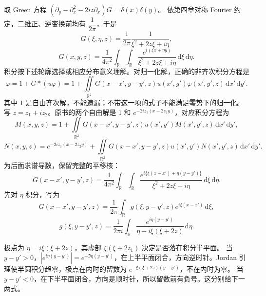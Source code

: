 \documentclass[lang=cn,scheme=chinese,mode=simple,device=normal,color=blue,math=cm,thmcnt=section,12pt]{elegantbook}
\newcommand{\dd}{\,\mathrm{d}}
\newcommand{\eqq}[2]{\tag{#1}\label{eq:#1}#2}
\begin{document}
取 Green 方程 $(\partial_y-\partial_x^2-2iz\partial_x)G=\delta(x)\delta(y)$。
依第四章对称 Fourier 约定，二维正、逆变换前均有 $\dfrac{1}{2\pi}$，于是
\begin{equation}
\eqq{7.5.8}{\widehat G(\xi,\eta,z)=\dfrac{1}{2\pi}\dfrac{1}{\xi^2+2z\xi+i\eta},}
\end{equation}
\begin{equation}
\eqq{7.5.9}{G(x,y,z)=\dfrac{1}{4\pi^2}\int_{\mathbb R}\int_{\mathbb R}
\dfrac{e^{i(\xi x+\eta y)}}{\xi^2+2z\xi+i\eta}\dd\xi\dd\eta.}
\end{equation}
积分按下述轮廓选择或相应分布意义理解。对归一化解，正确的非齐次积分方程是
\begin{equation}
\eqq{7.5.10}{\varphi=1+G*(u\varphi)
=1+\iint\limits_{\mathbb R^2}G(x-x',y-y',z)u(x',y')\varphi(x',y',z)\dd x'\dd y'.}
\end{equation}
其中 $1$ 是自由齐次解，不能遗漏；不带这一项的式子不能满足零势下的归一化。
写 $z=z_1+iz_2$。原书的两个自由解是 $1$ 和 $e^{-2iz_1(x-2z_2y)}$，对应积分方程为
\begin{equation}
\eqq{7.5.11}{M(x,y,z)=1+\iint\limits_{\mathbb R^2}G(x-x',y-y',z)u(x',y')M(x',y',z)\dd x'\dd y',}
\end{equation}
\begin{equation}
\eqq{7.5.12}{N(x,y,z)=e^{-2iz_1(x-2z_2y)}
+\iint\limits_{\mathbb R^2}G(x-x',y-y',z)u(x',y')N(x',y',z)\dd x'\dd y'.}
\end{equation}
为后面求谱导数，保留完整的平移核：
\begin{equation}
\eqq{7.5.13}{G(x-x',y-y',z)=\dfrac{1}{4\pi^2}\int_{\mathbb R}\int_{\mathbb R}
\dfrac{e^{i\{\xi(x-x')+\eta(y-y')\}}}{\xi^2+2z\xi+i\eta}\dd\xi\dd\eta.}
\end{equation}
先对 $\eta$ 积分，写为
\begin{equation}
\eqq{7.5.14}{G(x-x',y-y',z)=\dfrac{1}{2\pi}\int_{\mathbb R}g(\xi,y-y',z)e^{i\xi(x-x')}\dd\xi,}
\end{equation}
\begin{equation}
\eqq{7.5.15}{g(\xi,y-y',z)=\dfrac{1}{2\pi i}\int_{\mathbb R}
\dfrac{e^{i\eta(y-y')}}{\eta-i\xi(\xi+2z)}\dd\eta.}
\end{equation}
\begin{callout}[计算：两个半平面闭合与留数符号]
极点为 $\eta=i\xi(\xi+2z)$，其虚部 $\xi(\xi+2z_1)$ 决定是否落在积分半平面。
当 $y-y'>0$，$|e^{i\eta(y-y')}|=e^{-\Im\eta(y-y')}$，在上半平面闭合，方向逆时针。Jordan 引理使半圆积分趋零，极点在内时的留数为
$e^{-\xi(\xi+2z)(y-y')}$，不在内时为零。
当 $y-y'<0$，在下半平面闭合，方向是顺时针，所以留数前有负号。这分别给下一两式。
\end{callout}
\end{document}
